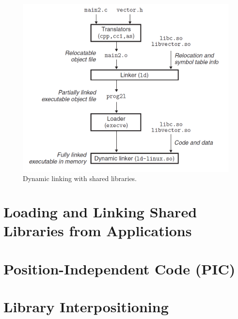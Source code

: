 \begin{figure}[h!]
    \centering
    \includegraphics[scale=0.5]{pic/section7/pic6.png}
    \caption{Dynamic linking with shared libraries.}
\end{figure}



\section{Loading and Linking Shared Libraries from Applications}

\section{Position-Independent Code (PIC)}


\section{Library Interpositioning}
